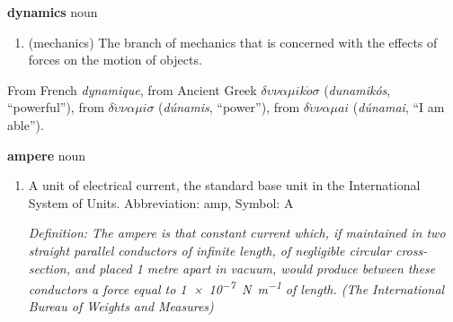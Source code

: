 \documentclass[
    DIV=12,
    BCOR=0mm,
    pagenumber=off,
    paper=11in:8.5in,
    pagesize,
]{scrartcl}
\begin{document}
\hfill\vfill
\begin{minipage}{\linewidth}
    \textbf{dynamics}
     noun
    \begin{enumerate}
        \item (mechanics) The branch of mechanics that is concerned
            with the effects of forces on the motion of objects.
    \end{enumerate}
    From French \emph{dynamique},
        from Ancient Greek $\delta\upsilon\nu\alpha\mu{}ik\acute{o}\sigma$ (\emph{dunamik\'{o}s}, ``powerful''),
        from $\delta\acute{\upsilon}\nu\alpha\mu{}i\sigma$ (\emph{d\'{u}namis}, ``power''),
        from $\delta\acute{\upsilon}\nu\alpha\mu{}ai$ (\emph{d\'{u}namai}, ``I am able'').
\end{minipage}
\vfill
\newpage


\hfill\vfill
\begin{minipage}{\linewidth}
    \textbf{ampere}
    \textipa{
    } noun
    \begin{enumerate}
        \item A unit of electrical current, the standard base unit in the
            International System of Units. Abbreviation: amp, Symbol: A

        \slshape Definition: The ampere is that constant current which,
            if maintained in two straight parallel conductors of infinite length,
            of negligible circular cross-section, and placed 1 metre apart in vacuum,
            would produce between these conductors a force equal to \SI{1e-7}{\newton\per\meter}
            of length. (The International Bureau of Weights and Measures)
    \end{enumerate}
\end{minipage}
\vfill
\newpage
\end{document}
